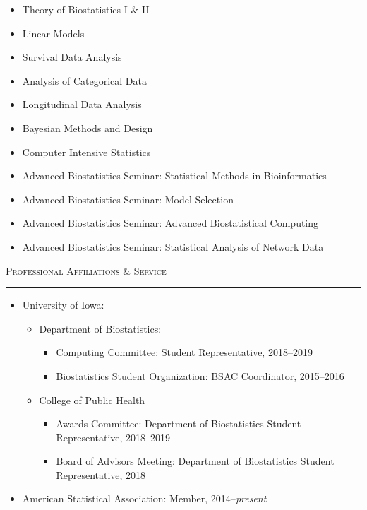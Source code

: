 \documentclass[a4paper]{article}
\begin{document}
\begin{itemize}
  \item Theory of Biostatistics I \& II
  \item Linear Models
  \item Survival Data Analysis
  \item Analysis of Categorical Data
  \item Longitudinal Data Analysis
  \item Bayesian Methods and Design
  \item Computer Intensive Statistics
  \item Advanced Biostatistics Seminar: Statistical Methods in Bioinformatics
  \item Advanced Biostatistics Seminar: Model Selection
  \item Advanced Biostatistics Seminar: Advanced Biostatistical Computing
  \item Advanced Biostatistics Seminar: Statistical Analysis of Network Data
\end{itemize}


\begin{flushleft}
  \Large\textsc{Professional Affiliations \& Service}
  \textcolor{usafagrey}{\rule[0.5\baselineskip]{\textwidth}{0.75pt}}
\end{flushleft}
\vspace{-1.5\baselineskip}

\begin{itemize}
  \item University of Iowa:
  \begin{itemize}
    \item Department of Biostatistics:
    \begin{itemize}
      \item Computing Committee: Student Representative, 2018--2019
      \item Biostatistics Student Organization: BSAC Coordinator, 2015--2016
    \end{itemize}
    \item College of Public Health
    \begin{itemize}
      \item Awards Committee: Department of Biostatistics Student Representative, 2018--2019
      \item Board of Advisors Meeting: Department of Biostatistics Student Representative, 2018
    \end{itemize}
  \end{itemize}
  \item American Statistical Association: Member, 2014--\textit{present}
\end{itemize}
\end{document}
